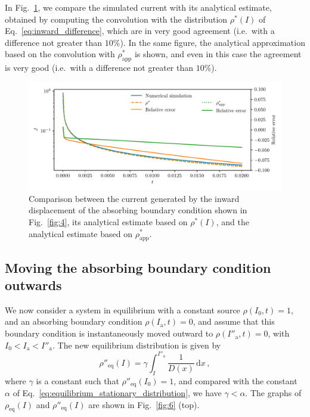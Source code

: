 In Fig.~\ref{fig:5}, we compare the simulated current with its analytical estimate, obtained by computing the convolution with the distribution $\rho^\ast(I)$ of Eq.~\eqref{eq:inward_difference}, which are in very good agreement {(i.e.\ with a difference not greater than $10\%$)}. In the same figure, the analytical approximation based on the convolution with $\rho^\ast_\text{app}$ is shown, and even in this case the agreement is very good {(i.e.\ with a difference not greater than $10\%$)}.

\begin{figure}[t]
    \centering
    \includegraphics[width=\textwidth]{4_probing_the_diffusive_behavior/figs/final/current_backwards.pdf}
    \caption{Comparison between the current generated by the inward displacement of the absorbing boundary condition shown in Fig.~\ref{fig:4}, its analytical estimate based on $\rho^\ast(I)$, and the analytical estimate based on $\rho^\ast_\text{app}$.}
    \label{fig:5}
\end{figure}


\subsection{Moving the absorbing boundary condition outwards}


We now consider a system in equilibrium with a constant source $\rho(I_0, t)=1$, and an absorbing boundary condition $\rho(I_\mathrm{a}, t)=0$, and assume that this boundary condition is instantaneously moved outward to $\rho(I''_\mathrm{a}, t)=0$, with $I_0 < I_\mathrm{a} < I''_\mathrm{a}$. The new equilibrium distribution is given by
\begin{equation}
    \rho''_\text{eq}(I) = \gamma \int_I^{I''_\mathrm{a}} \frac{1}{D(x)}\,\mathrm{d}x\,,
\end{equation}
where $\gamma$ is a constant such that $\rho''_\text{eq}(I_0)=1$, and compared with the constant $\alpha$ of Eq.~\eqref{eq:equilibrium_stationary_distribution}, we have $\gamma < \alpha$. The graphs of $\rho_\text{eq}(I)$ and $\rho''_\text{eq}(I)$ are shown in Fig.~\ref{fig:6} (top). 

